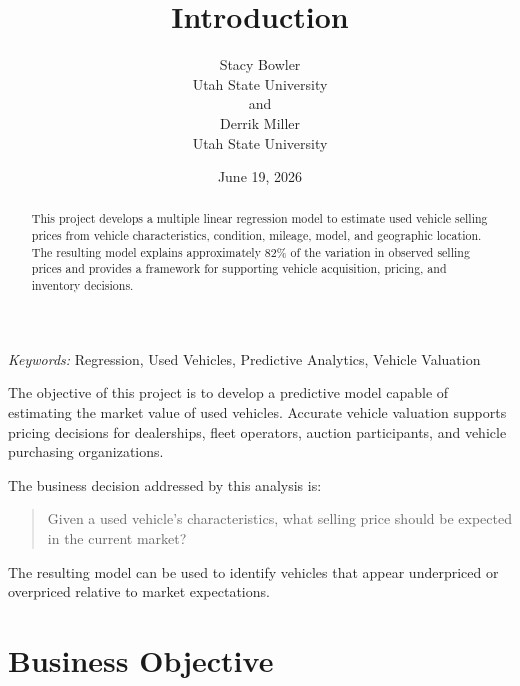 \documentclass[
  12pt]{article}
\begin{document}
\def\spacingset#1{\renewcommand{\baselinestretch}%
{#1}\small\normalsize} \spacingset{1}



\date{June 19, 2026}
\title{\bf Introduction}
\author{
Stacy Bowler\\
Utah State University\\
and\\Derrik Miller\\
Utah State University\\
}
\maketitle

\bigskip
\bigskip
\begin{abstract}
This project develops a multiple linear regression model to estimate
used vehicle selling prices from vehicle characteristics, condition,
mileage, model, and geographic location. The resulting model explains
approximately 82\% of the variation in observed selling prices and
provides a framework for supporting vehicle acquisition, pricing, and
inventory decisions.
\end{abstract}

\noindent%
{\it Keywords:} Regression, Used Vehicles, Predictive Analytics, Vehicle
Valuation
\vfill

\newpage
\spacingset{1.9} %


The objective of this project is to develop a predictive model capable
of estimating the market value of used vehicles. Accurate vehicle
valuation supports pricing decisions for dealerships, fleet operators,
auction participants, and vehicle purchasing organizations.

The business decision addressed by this analysis is:

\begin{quote}
Given a used vehicle's characteristics, what selling price should be
expected in the current market?
\end{quote}

The resulting model can be used to identify vehicles that appear
underpriced or overpriced relative to market expectations.

\section{Business Objective}\label{business-objective}
\end{document}
